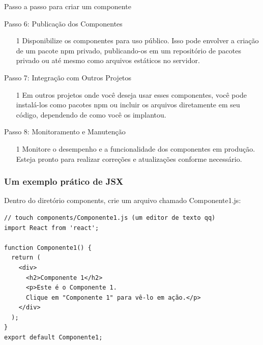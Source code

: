 \documentclass[13pt, xcolor={dvipsnames,svgnames}, portuguese]{beamer}
\begin{document}
\begin{frame}[fragile]{Passo a passo para criar um componente}

  \begin{block}{Passo 6: Publicação dos Componentes}    
    \begin{itemize}
		\item[1] Disponibilize os componentes para uso público. Isso pode envolver a criação de um pacote npm privado, publicando-os em um repositório de pacotes privado ou até mesmo como arquivos estáticos no servidor.
	\end{itemize}
  \end{block}

  \begin{block}{Passo 7: Integração com Outros Projetos}    
    \begin{itemize}
		\item[1] Em outros projetos onde você deseja usar esses componentes, você pode instalá-los como pacotes npm ou incluir os arquivos diretamente em seu código, dependendo de como você os implantou.
	\end{itemize}
  \end{block}

  \begin{block}{Passo 8: Monitoramento e Manutenção}    
    \begin{itemize}
		\item[1] Monitore o desempenho e a funcionalidade dos componentes em produção. Esteja pronto para realizar correções e atualizações conforme necessário.
	\end{itemize}
  \end{block}

\end{frame}

\begin{frame}[fragile]
\frametitle{Um exemplo prático de JSX}
Dentro do diretório components,
crie um arquivo chamado Componente1.js:

\begin{verbatim}
// touch components/Componente1.js (um editor de texto qq)
import React from 'react';

function Componente1() {
  return (
    <div>
      <h2>Componente 1</h2>
      <p>Este é o Componente 1. 
      Clique em "Componente 1" para vê-lo em ação.</p>
    </div>
  );
}
export default Componente1;
\end{verbatim}
\end{frame}
\end{document}
